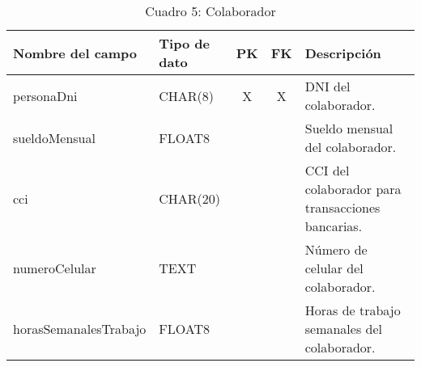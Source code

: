 \begin{table}[H]
	\centering
	\begin{tabular}{|l|l|c|c|l|}
		\hline
		\textbf{Nombre del campo} & \textbf{Tipo de dato} & \textbf{PK} & \textbf{FK} & \textbf{Descripción}                              \\
		\hline
		personaDni                & CHAR(8)               & X           & X           & DNI del colaborador.                              \\
		\hline
		sueldoMensual             & FLOAT8                &             &             & Sueldo mensual del colaborador.                   \\
		\hline
		cci                       & CHAR(20)              &             &             & CCI del colaborador para transacciones bancarias. \\
		\hline
		numeroCelular             & TEXT                  &             &             & Número de celular del colaborador.                \\
		\hline
		horasSemanalesTrabajo     & FLOAT8                &             &             & Horas de trabajo semanales del colaborador.       \\
		\hline
	\end{tabular}
	\caption{Cuadro 5: Colaborador}
\end{table}